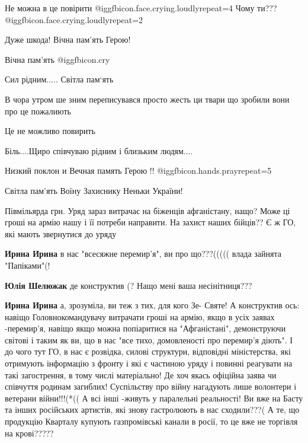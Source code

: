 \begin{itemize}
Не можна в це повірити  @igg{fbicon.face.crying.loudly}{repeat=4} 
Чому ти??? @igg{fbicon.face.crying.loudly}{repeat=2} 

Дуже шкода! Вічна пам'ять Герою!

Вічна пам'ять  @igg{fbicon.cry} 

Сил рідним.....
Світла пам‘ять

В чора утром ше зним переписувався просто жесть ци твари що зробили вони про це пожалиють

Це не можливо повирить

Біль....Щиро співчуваю рідним і близьким людям....

Низкий поклон и Вечная память Герою !! @igg{fbicon.hands.pray}{repeat=5} 

Світла пам'ять Воїну Захиснику Неньки України!


Півмільярда грн. Уряд зараз витрачає на біженців афганістану, нащо? Може ці
гроші на армію нашу і її потреби направити. На захист наших бійців?? Є ж ГО,
які мають звернутися до уряду

\begin{itemize} %


\textbf{Ирина Ирина} в нас "всесяжне перемир'я", ви про що???((((( влада зайнята "Папіками"(!

\textbf{Юлія Шелюжак} де конструктив (? Нащо мені ваша несінітниця???

\textbf{Ирина Ирина} а, зрозуміла, ви теж з тих, для кого Зе- Святе!
А конструктив ось: навіщо Головнокомандувачу витрачати гроші на армію, якщо в усіх заявах -перемир'я, навіщо якщо можна попіаритися на "Афганістані", демонструючи світові і таким як ви, що в нас "все тихо, домовленості про перемир'я діють". І до чого тут ГО, в нас є розвідка, силові структури, відповідні міністерства, які отримують інформацію з фронту і які є частиною уряду і повинні реагувати на такі загострення, в тому числі матеріально! Де хоч якась офіційна заява чи співчуття родинам загиблих! Суспільству про війну нагадують лише волонтери і ветерани війни!!!(*((
А всі інші -живуть у паралельні реальності!
Ви вже на Басту та інших російських артистів, які знову гастролюють в нас сходили???( А те, що продукцію Кварталу купують газпромівські канали в росії, то це вже не торгівля на крові?????


\end{itemize}
\end{itemize}
